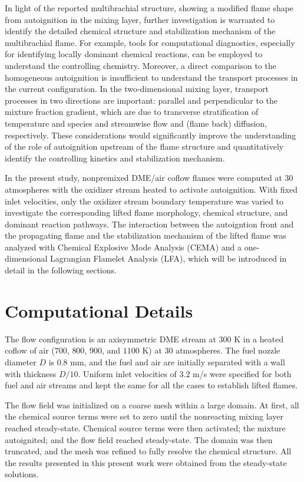 \documentclass[review,3p,times]{elsarticle}
\begin{document}
In light of the reported multibrachial structure, showing a modified flame shape from autoignition in the mixing layer, further investigation is warranted to identify the detailed chemical structure and stabilization mechanism of the multibrachial flame.  For example, tools for computational diagnostics, especially for identifying locally dominant chemical reactions, can be employed to understand the controlling chemistry.  Moreover, a direct comparison to the homogeneous autoignition is insufficient to understand the transport processes in the current configuration.  In the two-dimensional mixing layer, transport processes in two directions are important: parallel and perpendicular to the mixture fraction gradient, which are due to transverse stratification of temperature and species and streamwise flow and (flame back) diffusion, respectively.  These considerations would significantly improve the understanding of the role of autoignition upstream of the flame structure and quantitatively identify the controlling kinetics and stabilization mechanism.     

In the present study, nonpremixed DME/air coflow flames were computed at $30$ atmospheres with the oxidizer stream heated to activate autoignition.  With fixed inlet velocities, only the oxidizer stream boundary temperature was varied to investigate the corresponding lifted flame morphology, chemical structure, and dominant reaction pathways.  The interaction between the autoigntion front and the propagating flame and the stabilization mechanism of the lifted flame was analyzed with Chemical Explosive Mode Analysis (CEMA) and a one-dimensional Lagrangian Flamelet Analysis (LFA), which will be introduced in detail in the following sections.
 

\section{Computational Details}

The flow configuration is an axisymmetric DME stream at $300$ K in a heated coflow of air ($700$, $800$, $900$, and $1100$ K) at $30$ atmospheres.  The fuel nozzle diameter $D$ is $0.8$ mm, and the fuel and air are initially separated with a wall with thickness $D/10$.  Uniform inlet velocities of $3.2$ m/s were specified for both fuel and air streams and kept the same for all the cases to establish lifted flames.

The flow field was initialized on a coarse mesh within a large domain.  At first, all the chemical source terms were set to zero until the nonreacting mixing layer reached steady-state.  Chemical source terms were then activated; the mixture autoignited; and the flow field reached steady-state.  The domain was then truncated, and the mesh was refined to fully resolve the chemical structure.  All the results presented in this present work were obtained from the steady-state solutions.  
\end{document}
